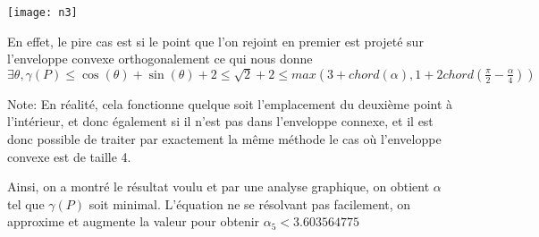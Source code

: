 \texttt{[image: n3]}

En effet, le pire cas est si le point que l'on rejoint en premier est projeté sur l'enveloppe convexe orthogonalement ce qui nous donne $\exists \theta, \gamma(P) \leq \cos(\theta) + \sin(\theta) + 2 \leq \sqrt{2} + 2 \leq max(3 + chord(\alpha), 1 + 2chord(\frac{\pi}{2} - \frac{\alpha}{4}))$

Note: En réalité, cela fonctionne quelque soit l'emplacement du deuxième point à l'intérieur, et donc également si il n'est pas dans l'enveloppe connexe, et il est donc possible de traiter par exactement la même méthode le cas où l'enveloppe convexe est de taille 4.

Ainsi, on a montré le résultat voulu et par une analyse graphique, on obtient $\alpha$ tel que $\gamma(P)$ soit minimal. L'équation ne se résolvant pas facilement, on approxime et augmente la valeur pour obtenir \(\alpha_5 < 3.603564775\)